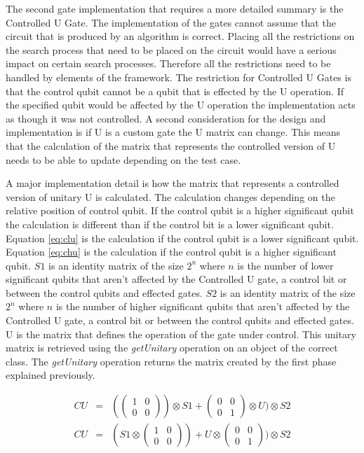 The second gate implementation that requires a more detailed summary is the Controlled U Gate.
The implementation of the gates cannot assume that the circuit that is produced by an algorithm is correct.
Placing all the restrictions on the search process that need to be placed on the circuit would have a serious impact on certain search processes.
Therefore all the restrictions need to be handled by elements of the framework.
The restriction for Controlled U Gates is that the control qubit cannot be a qubit that is effected by the U operation.
If the specified qubit would be affected by the U operation the implementation acts as though it was not controlled.
A second consideration for the design and implementation is if U is a custom gate the U matrix can change.
This means that the calculation of the matrix that represents the controlled version of U needs to be able to update depending on the test case.

A major implementation detail is how the matrix that represents a controlled version of unitary U is calculated.
The calculation changes depending on the relative position of control qubit.
If the control qubit is a higher significant qubit the calculation is different than if the control bit is a lower significant qubit.
Equation \ref{eq:clu} is the calculation if the control qubit is a lower significant qubit.
Equation \ref{eq:chu} is the calculation if the control qubit is a higher significant qubit.
$S1$ is an identity matrix of the size $2^n$ where $n$ is the number of lower significant qubits that aren't affected by the Controlled U gate, a control bit or between the control qubits and effected gates.
$S2$ is an identity matrix of the size $2^n$ where $n$ is the number of higher significant qubits that aren't affected by the Controlled U gate, a control bit or between the control qubits and effected gates.
U is the matrix that defines the operation of the gate under control.
This unitary matrix is retrieved using the \emph{getUnitary} operation on an object of the correct class.
The \emph{getUnitary} operation returns the matrix created by the first phase explained previously.

\begin{eqnarray}
\label{eq:clu}
 CU&=& (\begin{pmatrix}1&0\\0&0\end{pmatrix})\otimes S1 + \begin{pmatrix}0&0\\0&1\end{pmatrix}\otimes U) \otimes S2 \\
\label{eq:chu}
 CU&=& ( S1 \otimes \begin{pmatrix}1&0\\0&0\end{pmatrix}) +U \otimes \begin{pmatrix}0&0\\0&1\end{pmatrix}) \otimes S2
\end{eqnarray}

